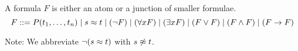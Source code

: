 
\begin{definition}\label{def:formula}
A {\myem formula} $F$ is either an 
{\myem atom} or a {\myem junction} of smaller formulae.
%
\[
 F ::= P(t_1,\ldots,t_n) \mid
	s\approx t \mid
	(\lnot F) \mid 
	(\forall x F) \mid
	(\exists x F) \mid
	(F\lor F) \mid
	(F\land F) \mid
	(F\rightarrow F)
\]
\end{definition}

\noindent Note: We abbreviate $\lnot(s\approx t)$ with $s\not\approx t$.